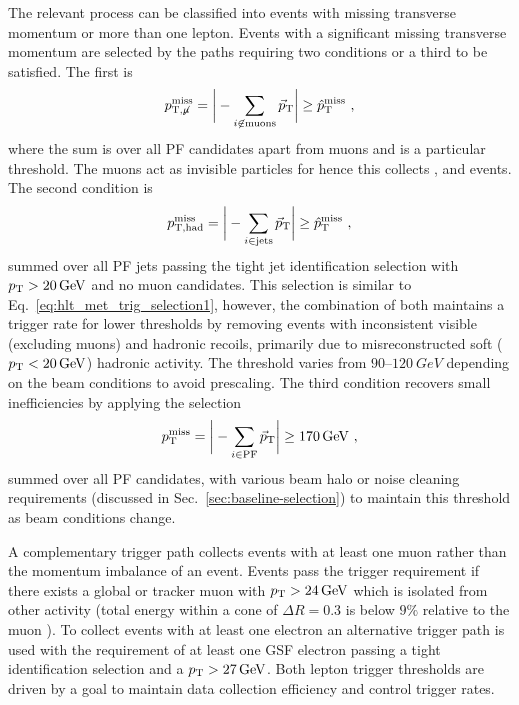 The relevant process can be classified into events with missing transverse momentum or more than one lepton. Events with a significant missing transverse momentum are selected by the \SWT paths requiring two conditions or a third to be satisfied. The first is
%
\begin{equation}\label{eq:hlt_met_trig_selection1}
    p_{\text{T,}\not\mu}^{\mathrm{miss}} = \bigg| -\sum_{i\not\in\mathrm{muons}} \vec{p}_{\mathrm{T}} \bigg| \ge \hat{p}_{\text{T}}^{\mathrm{miss}}\ ,
\end{equation}
%
where the sum is over all PF candidates apart from muons and \ptmissthresh is a particular threshold. The muons act as invisible particles for \ptmissnomu hence this collects \IZvv, \IWmv and \IDYmm events. The second condition is
%
\begin{equation}
    p_{\mathrm{T,had}}^{\mathrm{miss}} = \bigg| -\sum_{i\in\mathrm{jets}} \vec{p}_{\mathrm{T}} \bigg| \ge \ptmissthresh\ ,
\end{equation}
%
summed over all PF jets passing the tight jet identification selection with
${p_{\text{T}}>\SI{20}{GeV}}$ and no muon candidates. This selection is similar to
Eq.~\ref{eq:hlt_met_trig_selection1}, however, the combination of both
maintains a trigger rate for lower \ptmissthresh  thresholds by removing
events with inconsistent visible (excluding muons) and hadronic recoils,
primarily due to misreconstructed soft (${p_{\text{T}}<\SI{20}{GeV}}$) hadronic
activity. The threshold \ptmissthresh varies from {$90$--$\SI{120}{GeV}$}
depending on the \LHC beam conditions to avoid prescaling. The third condition
recovers small inefficiencies by applying the selection
%
\begin{equation}
    p_{\text{T}}^{\mathrm{miss}} = \bigg| -\sum_{i\in\mathrm{PF}} \vec{p}_{\mathrm{T}} \bigg| \ge \SI{170}{GeV}\ ,
\end{equation}
%
summed over all PF candidates, with various beam halo or \HCAL noise cleaning
requirements (discussed in Sec.~\ref{sec:baseline-selection}) to maintain this
threshold as beam conditions change.

A complementary trigger path collects events with at least one muon rather
than the momentum imbalance of an event. Events pass the trigger requirement
if there exists a global or tracker muon with ${p_{\text{T}}>\SI{24}{GeV}}$ which is
isolated from other activity (total energy within a cone of $\Delta R=0.3$ is
below $9\%$ relative to the muon \pt). To collect events with at least one
electron an alternative trigger path is used with the requirement of at least
one GSF electron passing a tight identification selection and a
${p_{\text{T}}>\SI{27}{GeV}}$. Both lepton trigger thresholds are driven by a goal to
maintain data collection efficiency and control trigger rates.


